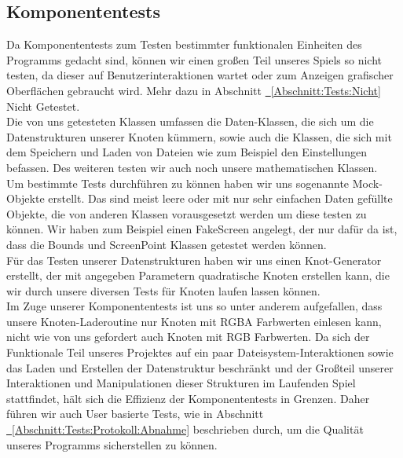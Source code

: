 %



\newpage



\label{Abschnitt:Tests:Protokoll:Komponenten}



\subsection*{Komponententests}


Da Komponententests zum Testen bestimmter funktionalen Einheiten des Programms gedacht sind, können wir einen großen Teil unseres Spiels so nicht testen, da dieser auf Benutzerinteraktionen wartet oder zum Anzeigen grafischer Oberflächen gebraucht wird. 
Mehr dazu in Abschnitt \hyperref[Abschnitt:Tests:Nicht]{\mousecursor~\ref{Abschnitt:Tests:Nicht}} \glqq Nicht Getestet\grqq.\\

Die von uns getesteten Klassen umfassen die Daten-Klassen, die sich um die Datenstrukturen unserer Knoten kümmern, sowie auch die Klassen, die sich mit dem Speichern und Laden von Dateien wie zum Beispiel den Einstellungen befassen.
Des weiteren testen wir auch noch unsere mathematischen Klassen.\\

Um bestimmte Tests durchführen zu können haben wir uns sogenannte Mock-Objekte erstellt. Das sind meist leere oder mit nur sehr einfachen Daten gefüllte Objekte, die von anderen Klassen vorausgesetzt werden um diese testen zu können. Wir haben zum Beispiel einen FakeScreen angelegt, der nur dafür da ist, dass die Bounds und ScreenPoint Klassen getestet werden können.\\

Für das Testen unserer Datenstrukturen haben wir uns einen Knot-Generator erstellt, der mit angegeben Parametern quadratische Knoten erstellen kann, die wir  durch unsere diversen Tests für Knoten laufen lassen können.\\

Im Zuge unserer Komponententests ist uns so unter anderem aufgefallen, dass unsere Knoten-Laderoutine nur Knoten mit RGBA Farbwerten einlesen kann, nicht wie von uns gefordert auch Knoten mit RGB Farbwerten. Da sich der Funktionale Teil unseres Projektes auf ein paar Dateisystem-Interaktionen sowie das Laden und Erstellen der Datenstruktur beschränkt und der Großteil unserer Interaktionen und Manipulationen dieser Strukturen im Laufenden Spiel stattfindet, hält sich die Effizienz der Komponententests in Grenzen. Daher führen wir auch User basierte Tests, wie in Abschnitt \hyperref[Abschnitt:Tests:Protokoll:Abnahme]{\mousecursor~\ref{Abschnitt:Tests:Protokoll:Abnahme}} beschrieben durch, um die Qualität unseres Programms sicherstellen zu können.

